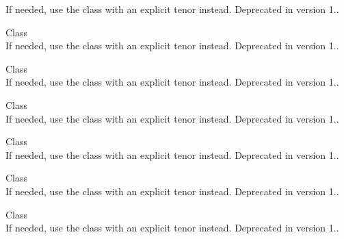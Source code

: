 \begin{DoxyRefList}
%
If needed, use the  class with an explicit tenor instead. Deprecated in version 1..  
\item[Class \doxylink{class_quant_lib_1_1_euribor365__1_y}{Quant\+Lib\+::Euribor365\+\_\+1Y} ]\hfill \\
\label{deprecated__deprecated000075}%
%
If needed, use the  class with an explicit tenor instead. Deprecated in version 1..  
\item[Class \doxylink{class_quant_lib_1_1_euribor365__2_m}{Quant\+Lib\+::Euribor365\+\_\+2M} ]\hfill \\
\label{deprecated__deprecated000065}%
%
If needed, use the  class with an explicit tenor instead. Deprecated in version 1..  
\item[Class \doxylink{class_quant_lib_1_1_euribor365__2_w}{Quant\+Lib\+::Euribor365\+\_\+2W} ]\hfill \\
\label{deprecated__deprecated000062}%
%
If needed, use the  class with an explicit tenor instead. Deprecated in version 1..  
\item[Class \doxylink{class_quant_lib_1_1_euribor365__3_m}{Quant\+Lib\+::Euribor365\+\_\+3M} ]\hfill \\
\label{deprecated__deprecated000066}%
%
If needed, use the  class with an explicit tenor instead. Deprecated in version 1..  
\item[Class \doxylink{class_quant_lib_1_1_euribor365__3_w}{Quant\+Lib\+::Euribor365\+\_\+3W} ]\hfill \\
\label{deprecated__deprecated000063}%
%
If needed, use the  class with an explicit tenor instead. Deprecated in version 1..  
\item[Class \doxylink{class_quant_lib_1_1_euribor365__4_m}{Quant\+Lib\+::Euribor365\+\_\+4M} ]\hfill \\
\label{deprecated__deprecated000067}%
%
If needed, use the  class with an explicit tenor instead. Deprecated in version 1..  

\end{DoxyRefList}
